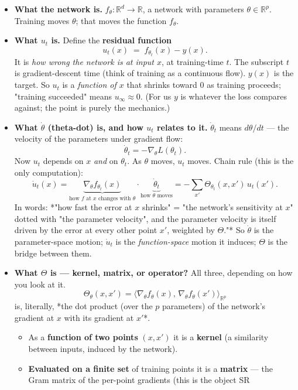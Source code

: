 \documentclass[11pt]{article}
\begin{document}
\begin{itemize}
\item \textbf{What the network is.} $f_\theta : \mathbb R^d \to \mathbb R$, a network
with parameters $\theta \in \mathbb R^p$. Training moves $\theta$; that
moves the function $f_\theta$.
\item \textbf{What $u_t$ is.} Define the \textbf{residual function}
\[u_t(x) \;=\; f_{\theta_t}(x) - y(x).\]
It is \emph{how wrong the network is at input $x$}, at training-time $t$. The
subscript $t$ is gradient-descent time (think of training as a continuous
flow). $y(x)$ is the target. So $u_t$ is a \emph{function of $x$} that shrinks
toward 0 as training proceeds; "training succeeded" means $u_\infty
  \approx 0$. (For us $y$ is whatever the loss compares against; the point
is purely the mechanics.)
\item \textbf{What $\dot\theta$ (theta-dot) is, and how $u_t$ relates to it.}
$\dot\theta_t$ means $d\theta/dt$ --- the velocity of the parameters under
gradient flow:
\[\dot\theta_t = -\nabla_\theta L(\theta_t).\]
Now $u_t$ depends on $x$ \emph{and} on $\theta_t$. As $\theta$ moves, $u_t$
moves. Chain rule (this is the only computation):
\[\dot u_t(x) = \underbrace{\nabla_\theta f_{\theta_t}(x)}
     _{\text{how }f\text{ at }x\text{ changes with }\theta}
     \cdot \underbrace{\dot\theta_t}_{\text{how }\theta\text{ moves}}
     = -\sum_{x'} \Theta_{\theta_t}(x,x')\,u_t(x').\]
In words: *"how fast the error at $x$ shrinks" = "the network's
sensitivity at $x$" dotted with "the parameter velocity", and the
parameter velocity is itself driven by the error at every other point
$x'$, weighted by $\Theta$."* So $\dot\theta$ is the parameter-space
motion; $\dot u_t$ is the \emph{function-space} motion it induces; $\Theta$ is
the bridge between them.
\item \textbf{What $\Theta$ is --- kernel, matrix, or operator?} All three, depending
on how you look at it.
\[\Theta_\theta(x,x') = \langle \nabla_\theta f_\theta(x),\,
     \nabla_\theta f_\theta(x')\rangle_{\mathbb R^p}\]
is, literally, *the dot product (over the $p$ parameters) of the
network's gradient at $x$ with its gradient at $x'$*.
\begin{itemize}
\item As a \textbf{function of two points} $(x,x')$ it is a \textbf{kernel} (a
similarity between inputs, induced by the network).
\item \textbf{Evaluated on a finite set} of training points it is a \textbf{matrix} ---
the Gram matrix of the per-point gradients (this is the object SR

\end{itemize}
\end{itemize}
\end{document}
